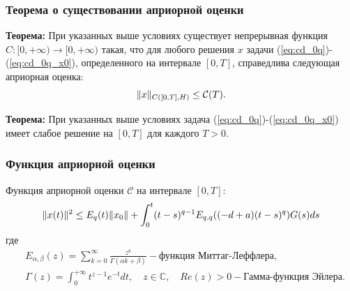 \documentclass{beamer}
\DeclarePairedDelimiter{\norm}{\lVert}{\rVert}
\begin{document}
    \begin{frame}
        \frametitle{Теорема о существовании априорной оценки}
        \textbf{Теорема:}
        При указанных выше условиях существует непрерывная функция $C: [0, +\infty) \rightarrow [0, +\infty)$ такая,
        что для любого решения $x$ задачи (\ref{eq:cd_0q})-(\ref{eq:cd_0q_x0}), определенного на интервале $[0, T]$,
        справедлива следующая априорная оценка:
        $$\norm{x}_{C([0, T], H)} \leq \mathcal{C}(T).$$

        \textbf{Теорема:}
        При указанных выше условиях задача (\ref{eq:cd_0q})-(\ref{eq:cd_0q_x0}) имеет слабое решение на $[0, T]$ для каждого $T > 0$.
    \end{frame}

    \begin{frame}
        \frametitle{Функция априорной оценки}
        Функция априорной оценки $\mathcal{C}$ на интервале $[0, T]$:
        \begin{equation}
            \label{eq:C}
            \norm{x(t)}^2 \leq E_q(t)\norm{x_0} + \int_0^t (t-s)^{q-1} E_{q,q}((-d+a)(t-s)^q)G(s)ds
        \end{equation}
        где
        \begin{equation*}
            \begin{aligned}
                &E_{\alpha, \beta}(z) = \sum_{k=0}^\infty \frac{z^k}{\Gamma (\alpha k + \beta)} - \text{функция Миттаг-Леффлера,}\\
                &\Gamma(z) = \int_0^{+\infty} t^{z-1} e^{-t} dt, \quad z \in \mathbb{C}, \quad Re(z) > 0 - \text{Гамма-функция Эйлера.}
            \end{aligned}
        \end{equation*}
    \end{frame}
\end{document}
